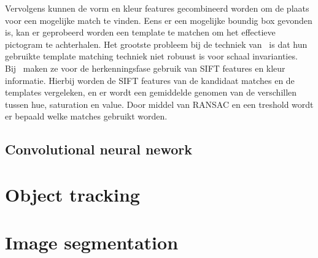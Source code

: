 \documentclass[11pt,a4paper]{article}
\begin{document}
            Vervolgens kunnen de vorm en kleur features gecombineerd worden om de plaats voor een mogelijke match te vinden. Eens er een mogelijke boundig box gevonden is,
            kan er geprobeerd worden een template te matchen om het effectieve pictogram te achterhalen. Het grootste probleem bij de techniek van~\cite{Fang2003} is
            dat hun gebruikte template matching techniek niet robuust is voor schaal invarianties.
            Bij~\cite{Zabihi2017} maken ze voor de herkenningsfase gebruik van SIFT\cite{Lowe1999} features en kleur informatie. 
            Hierbij worden de SIFT features van de kandidaat matches en de templates vergeleken, en er wordt een gemiddelde genomen van de verschillen tussen hue, saturation en value.
            Door middel van RANSAC en een treshold wordt er bepaald welke matches gebruikt worden.

        
        \subsection{Convolutional neural nework}

            


    \section{Object tracking}

    \section{Image segmentation}

    
    
\end{document}
